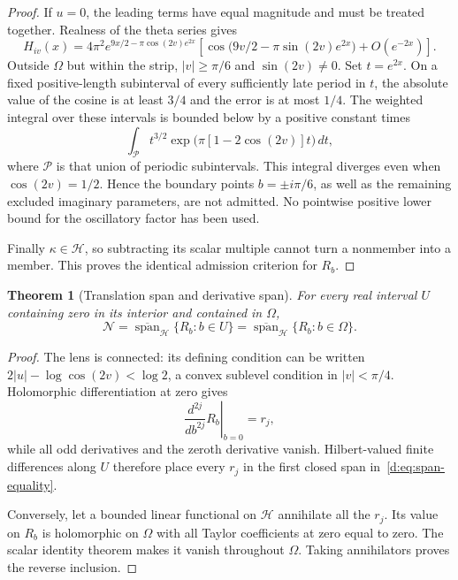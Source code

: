 \documentclass[11pt,a4paper]{article}
\numberwithin{equation}{section}
\newtheorem{theorem}{Theorem}[section]
\theoremstyle{definition}\newtheorem{definition}[theorem]{Definition}
\theoremstyle{remark}\newtheorem{remark}[theorem]{Remark}
\newcommand{\Hh}{\mathcal H}\newcommand{\Hw}{\mathcal H}
\newcommand{\Nn}{\mathcal N}\newcommand{\Ii}{\mathcal I}\newcommand{\Zz}{\mathcal Z}
\newcommand{\cl}{\overline{\operatorname{span}}}\newcommand{\Ran}{\operatorname{Ran}}\newcommand{\HS}{\mathfrak S_2}
\begin{document}
\begin{proof}
If $u=0$, the leading terms have equal magnitude and must be treated together. Realness of the theta series gives
\begin{equation}\label{d:eq:oscillatory-tail}
 H_{iv}(x)=4\pi^2e^{9x/2-\pi\cos(2v)e^{2x}}
 \left[\cos\bigl(9v/2-\pi\sin(2v)e^{2x}\bigr)+O(e^{-2x})\right].
\end{equation}
Outside $\Omega$ but within the strip, $|v|\ge\pi/6$ and $\sin(2v)\ne0$. Set $t=e^{2x}$. On a fixed positive-length subinterval of every sufficiently late period in $t$, the absolute value of the cosine is at least $3/4$ and the error is at most $1/4$. The weighted integral over these intervals is bounded below by a positive constant times
\begin{equation}\label{d:eq:oscillatory-divergence}
 \int_{\mathcal P} t^{3/2}\exp\bigl(\pi[1-2\cos(2v)]t\bigr)\,dt,
\end{equation}
where $\mathcal P$ is that union of periodic subintervals. This integral diverges even when $\cos(2v)=1/2$. Hence the boundary points $b=\pm i\pi/6$, as well as the remaining excluded imaginary parameters, are not admitted. No pointwise positive lower bound for the oscillatory factor has been used.

Finally $\kappa\in\Hh$, so subtracting its scalar multiple cannot turn a nonmember into a member. This proves the identical admission criterion for $R_b$.
\end{proof}

\begin{theorem}[Translation span and derivative span]\label{d:thm:span}
For every real interval $U$ containing zero in its interior and contained in $\Omega$,
\begin{equation}\label{d:eq:span-equality}
 \Nn=\cl_{\Hh}\{R_b:b\in U\}
     =\cl_{\Hh}\{R_b:b\in\Omega\}.
\end{equation}
\end{theorem}
\begin{proof}
The lens is connected: its defining condition can be written
$2|u|-\log\cos(2v)<\log2$, a convex sublevel condition in $|v|<\pi/4$.
Holomorphic differentiation at zero gives
\[
 \left.\frac{d^{2j}}{db^{2j}}R_b\right|_{b=0}=r_j,
\]
while all odd derivatives and the zeroth derivative vanish. Hilbert-valued finite differences along $U$ therefore place every $r_j$ in the first closed span in~\eqref{d:eq:span-equality}.

Conversely, let a bounded linear functional on $\Hh$ annihilate all the $r_j$. Its value on $R_b$ is holomorphic on $\Omega$ with all Taylor coefficients at zero equal to zero. The scalar identity theorem makes it vanish throughout $\Omega$. Taking annihilators proves the reverse inclusion.
\end{proof}
\end{document}
